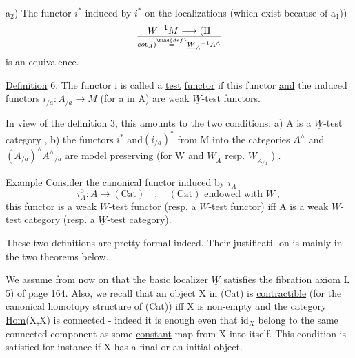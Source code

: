 
a$_2$) The functor $\overline{i^*}$ induced by $i^*$ on the localizations (which exist
because of a$_1$))
\[ W^{-1}M \longrightarrow (\mathrm{H}\over{e}{o}\mathrm{t}_A) \overset{\hand{def}}{=} \underline{W}_A{}^{-1}A^{\wedge} \]
is an equivalence.

\uline{Definition} 6. The functor i is called a \uline{test} \uline{functor} if this functor
\uline{and} the induced functors $i_{/a} : A_{/a} \longrightarrow M$ (for a in A) are weak $\underline{W}$-test
functors.

In view of the definition 3, this amounts to the two conditions:
a) A is a $\underline{W}$-test category ,  
b) the functors $i^*$ and$(i_{/a})^*$ from M into the categories $A^{\wedge}$ and
$(A_{/a})^{\wedge}$\hand{$\xrightarrow{\approx}$}$A^{\wedge}{}_{/a}$ are model preserving (for W and $\underline{W}_A$ resp. $\underline{W}_{A_{/a}}$ ) .

\uline{Example} Consider the canonical functor induced by $i_A$ 
\[ i^{\mathrm{o}}_A : A \longrightarrow (\mathrm{Cat}) \quad , \quad (\mathrm{Cat}) \text{ endowed with } \underline{W} \ , \]
this functor is a weak $\underline{W}$-test functor (resp. a $\underline{W}$-test functor) iff A is
a weak $\underline{W}$-test category (resp. a $\underline{W}$-test category).

These two definitions are pretty formal indeed. Their justificati-%
on is mainly in the two theorems below.

 \uline{We assume}  \uline{from now on that the basic localizer} $\underline{W}$
\uline{satisfies the fibration axiom} L 5) of page 164. Also, we recall
that an object X in (Cat) is \uline{contractible} (for the canonical
homotopy structure of (Cat)) iff X is non-empty and the category
\uline{Hom}(X,X) is connected - indeed it is enough even that id$_X$ belong to the
same connected component as some \uline{constant} map from X into itself. This
condition is satisfied for instance if X has a final or an initial
object.

